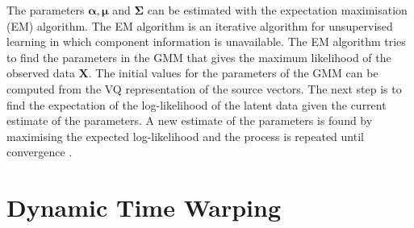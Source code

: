 The parameters $\boldsymbol{\alpha}, \boldsymbol{\mu}$ and $ \mathbf{\Sigma}$ can be estimated with the expectation maximisation (EM) algorithm. The EM algorithm is an iterative algorithm for unsupervised learning in which component information is unavailable. The EM algorithm tries to find the parameters in the GMM that gives the maximum likelihood of the observed data $\mathbf{X}$. The initial values for the parameters of the GMM can be computed from the VQ representation of the source vectors. The next step is to find the expectation of the log-likelihood of the latent data given the current estimate of the parameters. A new estimate of the parameters is found by maximising the expected log-likelihood and the process is repeated until convergence \cite{taletek}.


% 
% 
% 

\section{Dynamic Time Warping} %
\label{the:dynamic_time_warping}
\newcommand{\ttt}{\mathcal T}
\newcommand{\auto}{\boldsymbol \gamma}
\newcommand{\Auto}{\boldsymbol \Gamma}

